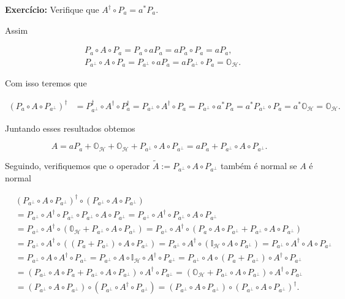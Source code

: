 \documentclass[11pt]{article}
\begin{document}
\textbf{Exercício:} Verifique que \(A^{\dagger}\circ P_{a}=a^{*}P_{a}\).

Assim

\begin{align}
& P_{a}\circ A\circ P_{a} = P_{a}\circ aP_{a} = a P_{a}\circ P_{a} = aP_{a}, \\
& P_{a^{\perp}}\circ A\circ P_{a} = P_{a^{\perp}}\circ aP_{a}=aP_{a^{\perp}}\circ P_{a}=\mathbb{O}_{\mathcal{H}}.
\end{align}

Com isso teremos que

\begin{align}
(P_{a}\circ A\circ P_{a^{\perp}})^{\dagger} & = P_{a^{\perp}}^{\dagger}\circ A^{\dagger}\circ P_{a}^{\dagger} = P_{a^{\perp}}\circ A^{\dagger}\circ P_{a} = P_{a^{\perp}}\circ a^{*}P_{a} = a^{*}P_{a^{\perp}}\circ P_{a} = a^{*}\mathbb{O}_{\mathcal{H}} = \mathbb{O}_{\mathcal{H}}.
\end{align}

    Juntando esses resultados obtemos

\begin{equation}
A = aP_{a} + \mathbb{O}_{\mathcal{H}} + \mathbb{O}_{\mathcal{H}} + P_{a^{\perp}}\circ A\circ P_{a^{\perp}} = aP_{a} + P_{a^{\perp}}\circ A\circ P_{a^{\perp}}.
\end{equation}

Seguindo, verifiquemos que o operador
\(\tilde{A}:=P_{a^{\perp}}\circ A\circ P_{a^{\perp}}\) também é normal
se \(A\) é normal

\begin{align}
& (P_{a^{\perp}}\circ A\circ P_{a^{\perp}})^{\dagger}\circ(P_{a^{\perp}}\circ A\circ P_{a^{\perp}}) \\
& = P_{a^{\perp}}\circ A^{\dagger}\circ P_{a^{\perp}}\circ P_{a^{\perp}}\circ A\circ P_{a^{\perp}} = P_{a^{\perp}}\circ A^{\dagger}\circ P_{a^{\perp}}\circ A\circ P_{a^{\perp}} \\ 
& = P_{a^{\perp}}\circ A^{\dagger}\circ(\mathbb{0}_{\mathcal{H}}+ P_{a^{\perp}}\circ A\circ P_{a^{\perp}}) = P_{a^{\perp}}\circ A^{\dagger}\circ(P_{a}\circ A\circ P_{a^{\perp}} + P_{a^{\perp}}\circ A\circ P_{a^{\perp}}) \\ 
& = P_{a^{\perp}}\circ A^{\dagger}\circ((P_{a}+P_{a^{\perp}})\circ A\circ P_{a^{\perp}}) = P_{a^{\perp}}\circ A^{\dagger}\circ (\mathbb{I}_{\mathcal{H}}\circ A\circ P_{a^{\perp}}) = P_{a^{\perp}}\circ A^{\dagger}\circ A\circ P_{a^{\perp}} \\
& = P_{a^{\perp}}\circ A\circ A^{\dagger}\circ P_{a^{\perp}} = P_{a^{\perp}}\circ A\circ\mathbb{I}_{\mathcal{H}}\circ A^{\dagger}\circ P_{a^{\perp}} = P_{a^{\perp}}\circ A\circ(P_{a}+P_{a^{\perp}})\circ A^{\dagger}\circ P_{a^{\perp}} \\
& = (P_{a^{\perp}}\circ A\circ P_{a}+P_{a^{\perp}}\circ A\circ P_{a^{\perp}})\circ A^{\dagger}\circ P_{a^{\perp}} =  (\mathbb{O}_{\mathcal{H}}+P_{a^{\perp}}\circ A\circ P_{a^{\perp}})\circ A^{\dagger}\circ P_{a^{\perp}} \\
& = (P_{a^{\perp}}\circ A\circ P_{a^{\perp}})\circ(P_{a^{\perp}}\circ A^{\dagger}\circ P_{a^{\perp}})= (P_{a^{\perp}}\circ A\circ P_{a^{\perp}})\circ(P_{a^{\perp}}\circ A\circ P_{a^{\perp}})^{\dagger}.
\end{align}
\end{document}
